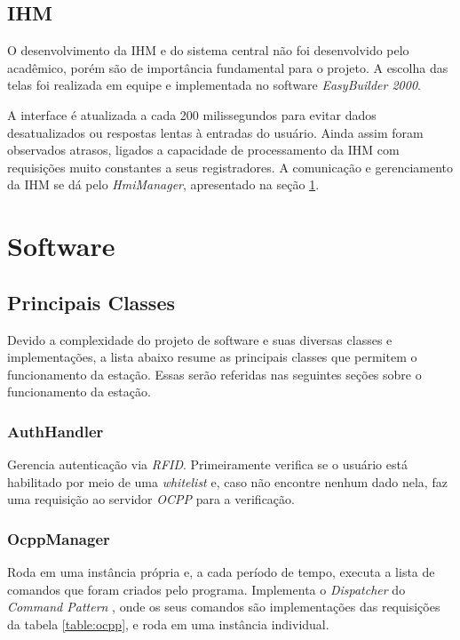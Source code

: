    \subsection{IHM}
    \label{methodology:structure:others}

      O desenvolvimento da \ac{IHM} e do sistema central não foi desenvolvido pelo acadêmico, porém são de importância fundamental para o projeto. A escolha das telas foi realizada em equipe e implementada no software \textit{EasyBuilder 2000}. {}

      A interface é atualizada a cada 200 milissegundos para evitar dados desatualizados ou respostas lentas à entradas do usuário. Ainda assim foram observados atrasos, ligados a capacidade de processamento da \ac{IHM} com requisições muito constantes a seus registradores. A comunicação e gerenciamento da \ac{IHM} se dá pelo \textit{HmiManager}, apresentado na seção \ref{methodology:structure:sw}.

  \section{Software}
  \label{methodology:structure:sw}

    \subsection{Principais Classes}

    Devido a complexidade do projeto de software e suas diversas classes e implementações, a lista abaixo resume as principais classes que permitem o funcionamento da estação. Essas serão referidas nas seguintes seções sobre o funcionamento da estação. 

        \subsubsection{AuthHandler}
          Gerencia autenticação via \textit{\ac{RFID}}. Primeiramente verifica se o usuário está habilitado por meio de uma \textit{whitelist} e, caso não encontre nenhum dado nela, faz uma requisição ao servidor \textit{\ac{OCPP}} para a verificação.
        \subsubsection{OcppManager}
          Roda em uma instância própria e, a cada período de tempo, executa a lista de comandos que foram criados pelo programa. Implementa o \textit{Dispatcher} do \textit{Command Pattern} \cite{book-gof}, onde os seus comandos são implementações das requisições da tabela \ref{table:ocpp}, e roda em uma instância individual.
